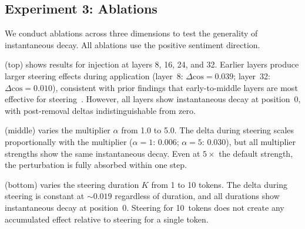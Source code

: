 \subsection{Experiment 3: Ablations}
\label{sec:ablations}

We conduct ablations across three dimensions to test the generality of
instantaneous decay. All ablations use the positive sentiment direction.

 (top) shows results for injection at layers 8, 16, 24,
and 32. Earlier layers produce larger steering effects during application
(layer~8: $\Delta\text{cos} = 0.039$; layer~32: $\Delta\text{cos} = 0.010$),
consistent with prior findings that early-to-middle layers are most
effective for steering~\citep{turner2023actadd}. However, all layers show
instantaneous decay at position~0, with post-removal deltas indistinguishable
from zero.

 (middle) varies the multiplier $\alpha$ from 1.0 to 5.0.
The delta during steering scales proportionally with the multiplier ($\alpha=1$:
$0.006$; $\alpha=5$: $0.030$), but all multiplier strengths show the same
instantaneous decay. Even at $5\times$ the default strength, the perturbation
is fully absorbed within one step.

 (bottom) varies the steering duration $K$ from 1 to 10
tokens. The delta during steering is constant at ${\sim}0.019$ regardless of
duration, and all durations show instantaneous decay at position~0. Steering for
10~tokens does not create any accumulated effect relative to steering for a
single token.

